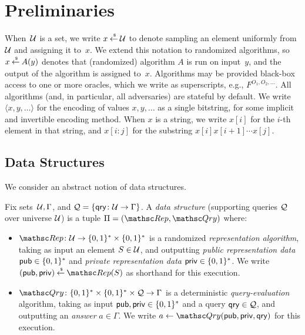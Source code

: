 \newcommand{\qry}{\mathsf{qry}}
\section{Preliminaries}

When~${\cal U}$ is a set, we write $x {\:\stackrel{{\scriptscriptstyle \hspace{0.2em}\$}} {\leftarrow}\:} {\cal U}$ to denote sampling
an element uniformly from~${\cal U}$ and assigning it to~$x$. We extend
this notation to randomized algorithms, so $x {\:\stackrel{{\scriptscriptstyle \hspace{0.2em}\$}} {\leftarrow}\:} A(y)$ denotes
that (randomized) algorithm $A$ is run on input~$y$, and the output
of the algorithm is assigned to~$x$. Algorithms may be provided
black-box access to one or more oracles, which we write as
superscripts, e.g., $F^{O_1,O_2,\ldots}$.  All algorithms (and, in
particular, all adversaries) are stateful by default. We write
$\langle x,y,\ldots \rangle$ for the encoding of values $x,y,\ldots$
as a single bitstring, for some implicit and invertible encoding
method. When $x$ is a string, we write $x[i]$ for the $i$-th element
in that string, and $x[i:j]$ for the substring $x[i]x[i+1]\cdots
x[j]$.

\subsection{Data Structures}

We consider an abstract notion of data structures.

\begin{definition} \rm
Fix sets~${\cal U}, \Gamma$, and $\calQ = \{\qry \colon \univ \to
\Gamma\}$. A \emph{data structure} (supporting queries ${\cal Q}$ over
universe ${\cal U}$) is a tuple $\setprim=(\Rep, \Qry)$ where:
\begin{itemize}
\item $\Rep \colon \univ \to \bits^* \times \bits^*$ is a
    randomized \emph{representation algorithm}, taking as input
    an element $S \in {\cal U}$,
    and outputting %
    \emph{public representation data} ${\sf pub} \in \{0,1\}^*$ and
    \emph{private representation data} ${\sf priv} \in \{0,1\}^*$.
    We write $(\pubaux,\privaux) \getsr \Rep(S)$ as shorthand
    for this execution.
\item $\Qry\colon \bits^* \times \bits^* \times \calQ \to
    \Gamma$ is a deterministic \emph{query-evaluation}
    algorithm, taking as input ${\sf pub},{\sf priv} \in \{0,1\}^*$
    and a query $\qry \in \calQ$, and outputting an
    \emph{answer} $a \in \Gamma$.  We write $a \gets
    \Qry(\pubaux,\privaux,\qry)$ for this execution. \hfill\dqed
\end{itemize}
\end{definition}

